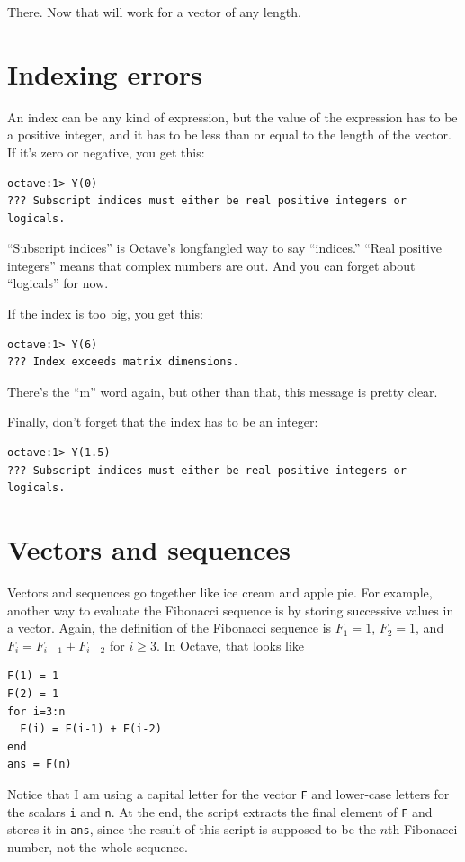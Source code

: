 \documentclass{book}
\begin{document}
There. Now that will work for a vector of any length.


\section{Indexing errors}

An index can be any kind of expression, but the value of the
expression has to be a positive integer, and it has to be
less than or equal to the length of the vector. If it's
zero or negative, you get this:

\begin{verbatim}
octave:1> Y(0)
??? Subscript indices must either be real positive integers or
logicals.
\end{verbatim}

``Subscript indices'' is Octave's longfangled way to say ``indices.''
``Real positive integers'' means that complex numbers are
out. And you can forget about ``logicals'' for now.

If the index is too big, you get this:

\begin{verbatim}
octave:1> Y(6)
??? Index exceeds matrix dimensions.
\end{verbatim}

There's the ``m'' word again, but other than that, this message
is pretty clear.

Finally, don't forget that the index has to be an integer:

\begin{verbatim}
octave:1> Y(1.5)
??? Subscript indices must either be real positive integers or
logicals.
\end{verbatim}


\section{Vectors and sequences}

Vectors and sequences go together like ice cream and apple pie. For
example, another way to evaluate the Fibonacci sequence is by
storing successive values in a vector. Again, the definition of the
Fibonacci sequence is $F_1 = 1$, $F_2 = 1$, and $F_{i} = F_{i-1} +
F_{i-2}$ for $i \ge 3$. In Octave, that looks like

\begin{verbatim}
F(1) = 1
F(2) = 1
for i=3:n
  F(i) = F(i-1) + F(i-2)
end
ans = F(n)
\end{verbatim}

Notice that I am using a capital letter for the vector {\tt F}
and lower-case letters for the scalars {\tt i} and {\tt n}.
At the end, the script extracts the final element of {\tt F} and
stores it in {\tt ans}, since the result of this script is supposed
to be the $n$th Fibonacci number, not the whole sequence.
\end{document}
